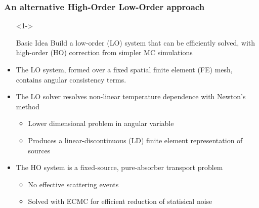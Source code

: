 \documentclass[xcolor=dvipsnames,hyperref={pdfpagelabels=false},handout,unknownkeysallowed]{beamer}
\newcommand{\colb}[1]{{\color{blue} #1}}
\newlength{\wideitemsep}
\let\olditem\item
\renewcommand{\item}{\setlength{\itemsep}{\wideitemsep}\olditem}
\begin{document}
\begin{frame}
    \frametitle{An alternative  High-Order Low-Order approach}
    {\small
        \begin{itemize}
            \item[]<1-> \begin{block}{Basic Idea} Build a low-order (LO) system that can be efficiently solved,
                with high-order (HO) correction from simpler MC simulations \end{block}
                \vspace{-0.321in}
              \item<1-> The LO system, formed over a fixed spatial finite element
                  (FE) mesh, contains \colb{angular consistency terms}.
              \item<2-> The LO solver resolves non-linear temperature dependence with
                  Newton's method
                \begin{itemize}
                    \item<2-> \colb{Lower dimensional} problem in angular variable
                    \item<2-> Produces a linear-discontinuous (LD) finite element  representation of sources
                \end{itemize}
                \vspace{-0.1in}
            \item<3-> The HO system is a fixed-source, pure-absorber transport problem
                \begin{itemize}
                    \item No effective scattering events
                    \item Solved with ECMC for efficient reduction of statisical noise 
                \end{itemize}
        \end{itemize}
    }
\end{frame}
\end{document}
